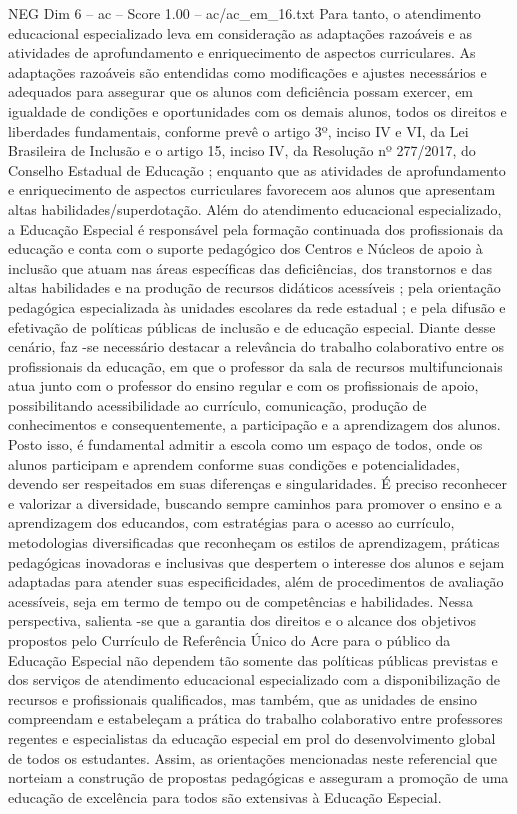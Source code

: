 \begin{textsample}{NEG Dim 6 – ac – Score 1.00 – ac/ac\_em\_16.txt}
Para tanto, o atendimento educacional especializado leva em consideração as adaptações razoáveis e as atividades de aprofundamento e enriquecimento de aspectos curriculares.
As adaptações razoáveis são entendidas como modificações e ajustes necessários e adequados para assegurar que os alunos com deficiência possam exercer, em igualdade de condições e oportunidades com os demais alunos, todos os direitos e liberdades fundamentais, conforme prevê o artigo 3º, inciso IV e VI, da Lei Brasileira de Inclusão e o artigo 15, inciso IV, da Resolução nº 277/2017, do Conselho Estadual de Educação ; enquanto que as atividades de aprofundamento e enriquecimento de aspectos curriculares favorecem aos alunos que apresentam altas habilidades/superdotação.
Além do atendimento educacional especializado, a Educação Especial é responsável pela formação continuada dos profissionais da educação e conta com o suporte pedagógico dos Centros e Núcleos de apoio à inclusão que atuam nas áreas específicas das deficiências, dos transtornos e das altas habilidades e na produção de recursos didáticos acessíveis ; pela orientação pedagógica especializada às unidades escolares da rede estadual ; e pela difusão e efetivação de políticas públicas de inclusão e de educação especial.
Diante desse cenário, faz -se necessário destacar a relevância do trabalho colaborativo entre os profissionais da educação, em que o professor da sala de recursos multifuncionais atua junto com o professor do ensino regular e com os profissionais de apoio, possibilitando acessibilidade ao currículo, comunicação, produção de conhecimentos e consequentemente, a participação e a aprendizagem dos alunos.
Posto isso, é fundamental admitir a escola como um espaço de todos, onde os alunos participam e aprendem conforme suas condições e potencialidades, devendo ser respeitados em suas diferenças e singularidades.
É preciso reconhecer e valorizar a diversidade, buscando sempre caminhos para promover o ensino e a aprendizagem dos educandos, com estratégias para o acesso ao currículo, metodologias diversificadas que reconheçam os estilos de aprendizagem, práticas pedagógicas inovadoras e inclusivas que despertem o interesse dos alunos e sejam adaptadas para atender suas especificidades, além de procedimentos de avaliação acessíveis, seja em termo de tempo ou de competências e habilidades.
Nessa perspectiva, salienta -se que a garantia dos direitos e o alcance dos objetivos propostos pelo Currículo de Referência Único do Acre para o público da Educação Especial não dependem tão somente das políticas públicas previstas e dos serviços de atendimento educacional especializado com a disponibilização de recursos e profissionais qualificados, mas também, que as unidades de ensino compreendam e estabeleçam a prática do trabalho colaborativo entre professores regentes e especialistas da educação especial em prol do desenvolvimento global de todos os estudantes.
Assim, as orientações mencionadas neste referencial que norteiam a construção de propostas pedagógicas e asseguram a promoção de uma educação de excelência para todos são extensivas à Educação Especial.

\end{textsample}
